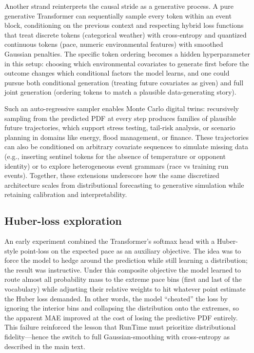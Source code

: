\documentclass{article}
\begin{document}
Another strand reinterprets the causal stride as a generative process. A pure generative Transformer can sequentially sample every token within an event block, conditioning on the previous context and respecting hybrid loss functions that treat discrete tokens (categorical weather) with cross-entropy and quantized continuous tokens (pace, numeric environmental features) with smoothed Gaussian penalties. The specific token ordering becomes a hidden hyperparameter in this setup: choosing which environmental covariates to generate first before the outcome changes which conditional factors the model learns, and one could pursue both conditional generation (treating future covariates as given) and full joint generation (ordering tokens to match a plausible data-generating story).

Such an auto-regressive sampler enables Monte Carlo digital twins: recursively sampling from the predicted PDF at every step produces families of plausible future trajectories, which support stress testing, tail-risk analysis, or scenario planning in domains like energy, flood management, or finance. These trajectories can also be conditioned on arbitrary covariate sequences to simulate missing data (e.g., inserting sentinel tokens for the absence of temperature or opponent identity) or to explore heterogeneous event grammars (race vs training run events). Together, these extensions underscore how the same discretized architecture scales from distributional forecasting to generative simulation while retaining calibration and interpretability.
 
\subsection{Huber-loss exploration}
An early experiment combined the Transformer’s softmax head with a Huber-style point-loss on the expected pace as an auxiliary objective. The idea was to force the model to hedge around the prediction while still learning a distribution; the result was instructive. Under this composite objective the model learned to route almost all probability mass to the extreme pace bins (first and last of the vocabulary) while adjusting their relative weights to hit whatever point estimate the Huber loss demanded. In other words, the model “cheated” the loss by ignoring the interior bins and collapsing the distribution onto the extremes, so the apparent MAE improved at the cost of losing the predictive PDF entirely. This failure reinforced the lesson that RunTime must prioritize distributional fidelity—hence the switch to full Gaussian-smoothing with cross-entropy as described in the main text.
\clearpage


\end{document}
